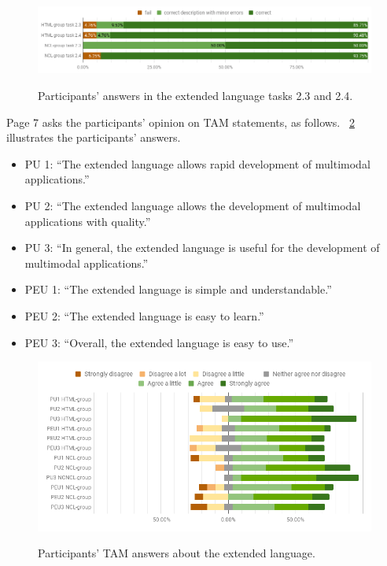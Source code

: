 \documentclass[
  doutorado,
  american
]{ThesisPUC}
\newcommand{\fig}[1]{\figurename~\ref{#1}}
\newcommand{\captionvspace}{\vspace{-1.3em}}
\begin{document}
\begin{figure}[!ht]
\begin{center}
	\includegraphics[width=14cm, keepaspectratio]{img/img24.png}
    \captionvspace
	\caption{Participants’ answers in the extended language tasks 2.3 and 2.4.}
    \captionvspace
	\label{fig:lang-res2}
\end{center}
\end{figure}

Page 7 asks the participants’ opinion on TAM statements, as follows. 
\fig{fig:lang-res3} illustrates the participants’ answers.

\begin{itemize}
	\item PU 1: “The extended language allows rapid development of multimodal
	applications.”
	\item PU 2: “The extended language allows the development of multimodal
	applications with quality.”
	\item PU 3: “In general, the extended language is useful for the development
	of multimodal applications.”
	\item PEU 1: “The extended language is simple and understandable.”
	\item PEU 2: “The extended language is easy to learn.”
	\item PEU 3: “Overall, the extended language is easy to use.”
\end{itemize}

\begin{figure}[!ht]
\begin{center}
	\includegraphics[width=14cm, keepaspectratio]{img/img25.png}
    \captionvspace
	\caption{Participants’ TAM answers about the extended language.}
    \captionvspace
	\label{fig:lang-res3}
\end{center}
\end{figure}
\end{document}

